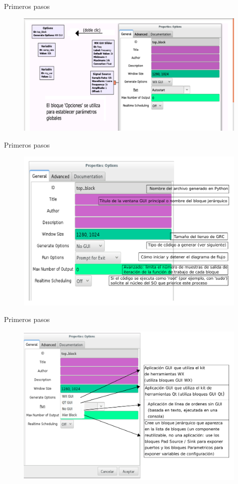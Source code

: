\begin{frame}{Primeros pasos}
\begin{figure}[H]
\centering
\includegraphics[width=\textwidth]{lab1/pdf/lab103.pdf}
\end{figure}
\end{frame}

\begin{frame}{Primeros pasos}
\begin{figure}[H]
\centering
\includegraphics[width=\textwidth, height=0.6\textwidth]{lab1/pdf/lab104.pdf}
\end{figure}
\end{frame}

\begin{frame}{Primeros pasos}
\begin{figure}[H]
\centering
\includegraphics[width=\textwidth, height=0.6\textwidth]{lab1/pdf/lab105.pdf}
\end{figure}
\end{frame}

